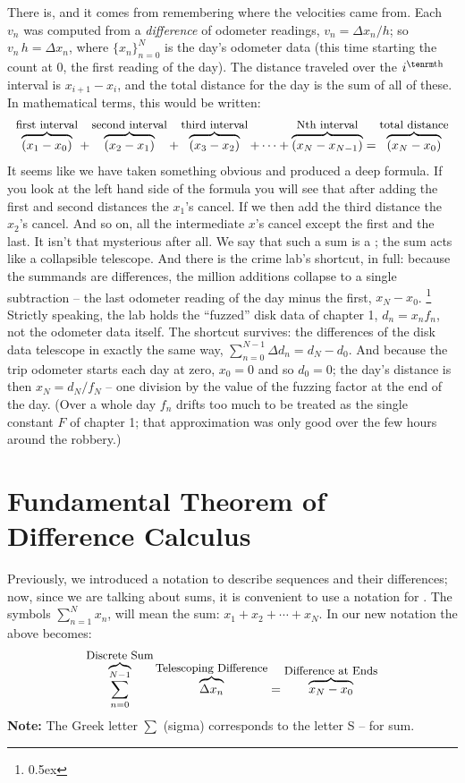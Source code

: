 There is, and it comes from remembering where the velocities came from. Each
$v_n$ was computed from a {\it difference\/} of odometer readings,
$v_n = \Delta x_n / h$; so $v_n \, h = \Delta x_n$, where
$\{x_n\}_{n=0}^{N}$ is the day's odometer data (this time starting the count at
$0$, the first reading of the day). The distance traveled over the $i^{\rm th}$
interval is $x_{i+1} - x_i$, and the total distance for the day is the sum
of all of these. In mathematical terms, this would be written:
$$
\mathop{\overbrace{(x_1 - x_0)}}\limits^{\hbox{\small first interval}}  + 
\mathop{\overbrace{(x_2 - x_1)}}\limits^{\hbox{\small second interval}} + 
\mathop{\overbrace{(x_3 - x_2)}}\limits^{\hbox{\small third interval}} + \cdots + 
\mathop{\overbrace{(x_N - x_{N-1})}}\limits^{\hbox{\small Nth interval}} = \mathop{\overbrace{(x_N - x_0)}}\limits^{\hbox{\small total distance}}
$$
It seems like we have taken something obvious and produced a deep formula.
If you look at the left hand side of the formula you will see that after 
adding the first and second distances the $x_1$'s cancel. If we 
then add the third distance the $x_2$'s cancel. And so on, all the intermediate 
$x$'s cancel except the first and the last. It isn't that mysterious after all.
We say that such a sum is a
; the sum acts like a collapsible telescope.
And there is the crime lab's shortcut, in full: because the summands are
differences, the million additions collapse to a single subtraction -- the
last odometer reading of the day minus the first, $x_N - x_0$.%
\footnote{\kern 0.5pt \raise 0.5ex \hbox{\dag}}%
{Strictly speaking, the lab holds the ``fuzzed'' disk data of chapter 1,
$d_n = x_n f_n$, not the odometer data itself. The shortcut survives: the
differences of the disk data telescope in exactly the same way,
$\sum_{n=0}^{N-1} \Delta d_n = d_N - d_0$. And because the trip odometer
starts each day at zero, $x_0 = 0$ and so $d_0 = 0$; the day's distance is
then $x_N = d_N / f_N$ -- one division by the value of the fuzzing factor at
the end of the day. (Over a whole day $f_n$ drifts too much to be treated
as the single constant $F$ of chapter 1; that approximation was only good
over the few hours around the robbery.)}

\section{Fundamental Theorem of Difference Calculus}
Previously, we introduced a notation to describe sequences and their differences; now, since we are talking 
about sums, it is convenient to use a notation for . The symbols
$\sum_{n=1}^{N} x_n$, will mean the sum: $x_1 + x_2 + \cdots + x_N$. 
In our new notation the above  becomes:
$$
\mathop{\overbrace{\sum_{n=0}^{N-1}}}\limits^{\hbox{\small Discrete Sum}} \mathop{\overbrace{\Delta x_n}}\limits^{\hbox{\small Telescoping Difference}} = 
\mathop{\overbrace{x_{N} - x_0}}\limits^{\hbox{\small Difference at Ends}}
$$
{\bf Note:\/} The Greek letter $\sum$ (sigma) corresponds to the letter S -- for sum.

